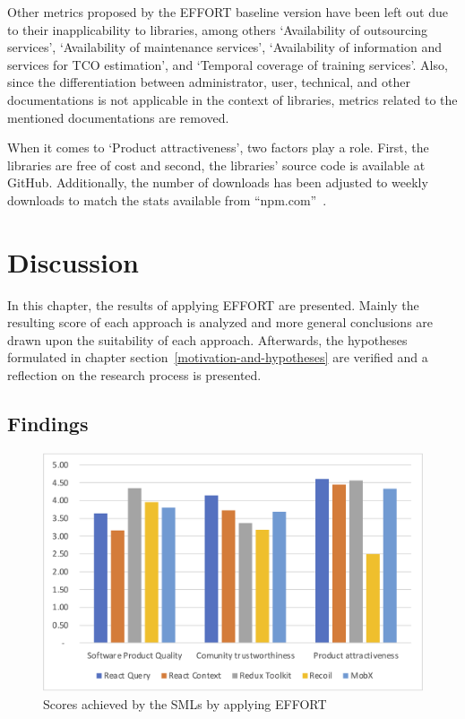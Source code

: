 Other metrics proposed by the EFFORT baseline version have been left out
due to their inapplicability to libraries, among others `Availability of
outsourcing services', `Availability of maintenance services',
`Availability of information and services for TCO estimation', and
`Temporal coverage of training services'. Also, since the
differentiation between administrator, user, technical, and other
documentations is not applicable in the context of libraries, metrics
related to the mentioned documentations are removed.

When it comes to `Product attractiveness', two factors play a role.
First, the libraries are free of cost and second, the libraries' source
code is available at GitHub.
Additionally, the number of downloads has been adjusted to weekly
downloads to match the stats available
from ``npm.com''~\cite{npm}.

\hypertarget{discussion}{%
    \chapter{Discussion}\label{discussion}}


In this chapter, the results of applying EFFORT are presented. Mainly
the resulting score of each approach is analyzed and more general
conclusions are drawn upon the suitability of each approach. Afterwards,
the hypotheses formulated in chapter section~\ref{motivation-and-hypotheses} are verified and a reflection
on the research process is presented.

\hypertarget{findings}{\section{Findings}\label{findings}}

\begin{figure}
    \centering
    \includegraphics{images/overview}
    \caption{Scores achieved by the SMLs by applying EFFORT}
    \label{image_results_total}
\end{figure}

